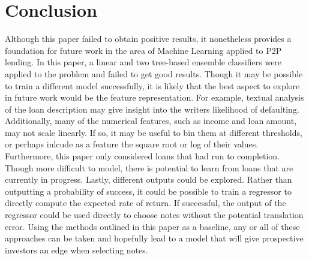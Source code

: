 \section{Conclusion}
Although this paper failed to obtain positive results, it nonetheless provides a foundation 
for future work in the area of Machine Learning applied to P2P lending. In this paper, a linear 
and two tree-based ensemble classifiers were applied to the problem and failed to get good results.
Though it may be possible to train a different model successfully, it is likely that the best 
aspect to explore in future work would be the feature representation. For example, textual analysis 
of the loan description may give insight into the writers likelihood of defaulting. Additionally, 
many of the numerical features, such as income and loan amount, may not scale linearly. If so, it may 
be useful to bin them at different thresholds, or perhaps inlcude as a feature the square root or log
of their values. Furthermore, this paper only considered loans that had run to completion. Though more 
difficult to model, there is potential to learn from loans that are currently in progress. Lastly, 
different outputs could be explored. Rather than outputting a probability of success, it could be 
possible to train a regressor to directly compute the expected rate of return. If successful, the 
output of the regressor could be used directly to choose notes without the potential translation 
error. Using the methods outlined in this paper as a baseline, any or all of these approaches 
can be taken and hopefully lead to a model that will give prospective investors an edge when 
selecting notes.
\label{conclusion}
